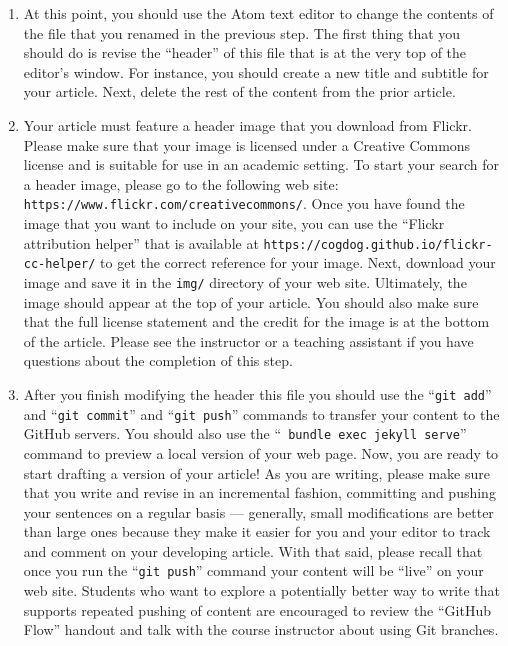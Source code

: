 \begin{enumerate}
  \item At this point, you should use the Atom text editor to change the contents of the file that you renamed in the
    previous step. The first thing that you should do is revise the ``header'' of this file that is at the very top of
    the editor's window. For instance, you should create a new title and subtitle for your article. Next, delete the
    rest of the content from the prior article.

  \item Your article must feature a header image that you download from Flickr. Please make sure that your image is
    licensed under a Creative Commons license and is suitable for use in an academic setting. To start your search for a
    header image, please go to the following web site: {\tt https://www.flickr.com/creativecommons/}. Once you have
    found the image that you want to include on your site, you can use the ``Flickr attribution helper'' that is
    available at {\tt https://cogdog.github.io/flickr-cc-helper/} to get the correct reference for your image. Next,
    download your image and save it in the {\tt img/} directory of your web site. Ultimately, the image should appear at
    the top of your article. You should also make sure that the full license statement and the credit for the image is
    at the bottom of the article. Please see the instructor or a teaching assistant if you have questions about the
    completion of this step.

  \item After you finish modifying the header this file you should use the ``{\tt git add}'' and ``{\tt git commit}''
    and ``{\tt git push}'' commands to transfer your content to the GitHub servers. You should also use the ``{\tt
    bundle exec jekyll serve}'' command to preview a local version of your web page. Now, you are ready to start
    drafting a version of your article! As you are writing, please make sure that you write and revise in an incremental
    fashion, committing and pushing your sentences on a regular basis --- generally, small modifications are better than
    large ones because they make it easier for you and your editor to track and comment on your developing article. With
    that said, please recall that once you run the ``{\tt git push}'' command your content will be ``live'' on your web
    site. Students who want to explore a potentially better way to write that supports repeated pushing of content are
    encouraged to review the ``GitHub Flow'' handout and talk with the course instructor about using Git branches.


\end{enumerate}
